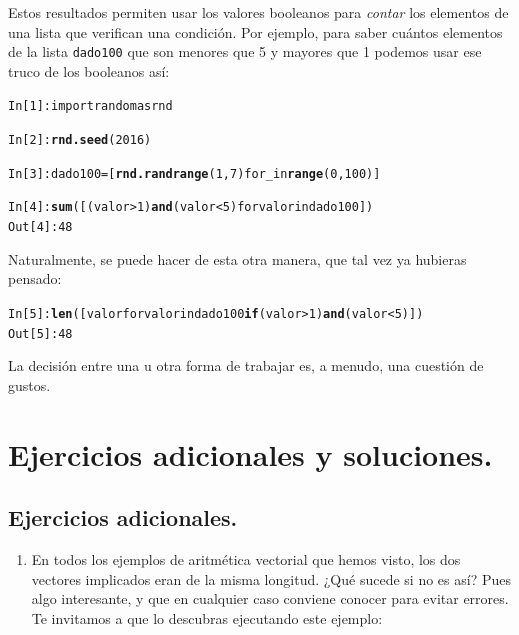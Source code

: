 \documentclass[10pt,a4paper]{article}\usepackage[]{graphicx}\usepackage[]{color}
\makeatletter
\newcommand{\hlkwd}[1]{\textcolor[rgb]{0.737,0.353,0.396}{\textbf{#1}}}%
\newenvironment{kframe}{%
 \def\at@end@of@kframe{}%
 \ifinner\ifhmode%
  \def\at@end@of@kframe{\end{minipage}}%
  \begin{minipage}{\columnwidth}%
 \fi\fi%
 \def\FrameCommand##1{\hskip\@totalleftmargin \hskip-\fboxsep
 \colorbox{shadecolor}{##1}\hskip-\fboxsep
     \hskip-\linewidth \hskip-\@totalleftmargin \hskip\columnwidth}%
 \MakeFramed {\advance\hsize-\width
   \@totalleftmargin\z@ \linewidth\hsize
   \@setminipage}}%
 {\par\unskip\endMakeFramed%
 \at@end@of@kframe}
\newenvironment{knitrout}{}{} %
\newcounter {cont01}
\makeatother
\begin{document}
Estos resultados permiten usar los valores booleanos para {\em contar} los elementos de una lista que verifican una condición. Por ejemplo, para saber cuántos elementos de la lista {\tt dado100} que son menores que 5 y mayores que 1 podemos usar ese truco de los booleanos así:
\begin{knitrout}
\color{fgcolor}\begin{kframe}
\begin{alltt}
In [1]: import random as rnd

In [2]: \hlkwd{rnd.seed}(2016)

In [3]: dado100 = [\hlkwd{rnd.randrange}(1, 7) for _ in \hlkwd{range}(0, 100)]

In [4]: \hlkwd{sum}([(valor > 1) \hlkwd{and} (valor <  5) for valor in dado100])
Out[4]: 48
\end{alltt}
\end{kframe}
\end{knitrout}
Naturalmente, se puede hacer de esta otra manera, que tal vez ya hubieras pensado:
\begin{knitrout}
\color{fgcolor}\begin{kframe}
\begin{alltt}
In [5]: \hlkwd{len}([valor for valor in dado100 \hlkwd{if} (valor > 1) \hlkwd{and} (valor <  5)])
Out[5]: 48
\end{alltt}
\end{kframe}
\end{knitrout}
La decisión entre una u otra forma de trabajar es, a menudo, una cuestión de gustos.


\section{Ejercicios adicionales y soluciones.}
\label{tut02:sec:SolucionesEjerciciosAdicionales}

\subsection*{Ejercicios adicionales.}


\begin{enumerate}
  \addtocounter{enumi}{27}
  \item En todos los ejemplos de aritmética vectorial que hemos visto, los dos vectores implicados eran de la misma longitud. ¿Qué sucede si no es así? Pues algo interesante, y que en cualquier caso conviene conocer para evitar errores. Te invitamos a que lo descubras ejecutando este ejemplo:


\end{enumerate}
\end{document}
